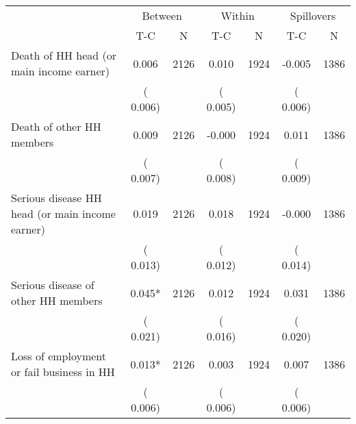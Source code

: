 
\begin{tabular}{l*{6}{c}}\hline&\multicolumn{2}{c}{Between}&\multicolumn{2}{c}{Within}&\multicolumn{2}{c}{Spillovers} \\ \cmidrule(r){2-3}\cmidrule(l){4-5}\cmidrule(l){6-7} & {T-C} & {N} & {T-C} & {N}  & {T-C}  & {N}  \\ \midrule
Death of HH head (or main income earner)        &              0.006      &       2126       &              0.010      &       1924       &             -0.005      &       1386       \\
                       &       (       0.006)            &                               &       (       0.005)            &                               &       (       0.006)            &                               \\
Death of other HH members        &              0.009      &       2126       &             -0.000      &       1924       &              0.011      &       1386       \\
                       &       (       0.007)            &                               &       (       0.008)            &                               &       (       0.009)            &                               \\
Serious disease HH head (or main income earner)        &              0.019      &       2126       &              0.018      &       1924       &             -0.000      &       1386       \\
                       &       (       0.013)            &                               &       (       0.012)            &                               &       (       0.014)            &                               \\
Serious disease of other HH members        &              0.045*      &       2126       &              0.012      &       1924       &              0.031      &       1386       \\
                       &       (       0.021)            &                               &       (       0.016)            &                               &       (       0.020)            &                               \\
Loss of employment or fail business in HH        &              0.013*      &       2126       &              0.003      &       1924       &              0.007      &       1386       \\
                       &       (       0.006)            &                               &       (       0.006)            &                               &       (       0.006)            &                               \\

\end{tabular}
